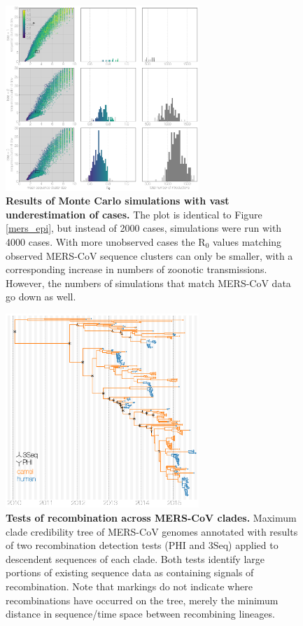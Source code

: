 \documentclass[11pt,oneside,letterpaper]{article}
\begin{document}
\begin{figure}[h]
\centering
	\includegraphics[width=0.65\textwidth]{figures/mers_epi_4000c.png}
	\caption{\textbf{Results of Monte Carlo simulations with vast underestimation of cases.}
The plot is identical to Figure \ref{mers_epi}, but instead of 2000 cases,
simulations were run with 4000 cases.
With more unobserved cases the R$_{0}$ values matching observed MERS-CoV sequence clusters can only be smaller, with a corresponding increase in numbers of zoonotic transmissions.
However, the numbers of simulations that match MERS-CoV data go down as well.
	}
	\label{extra_cases}
\end{figure}

\begin{figure}[h]
\centering
	\includegraphics[width=0.65\textwidth]{figures/mers_recombination_tree.png}
	\caption{\textbf{Tests of recombination across MERS-CoV clades.}
Maximum clade credibility tree of MERS-CoV genomes annotated with results of two recombination detection tests (PHI and 3Seq) applied to descendent sequences of each clade.
Both tests identify large portions of existing sequence data as containing signals of recombination.
Note that markings do not indicate where recombinations have occurred on the tree, merely the minimum distance in sequence/time space between recombining lineages.}
	\label{recombination_tree}
\end{figure}
\end{document}
